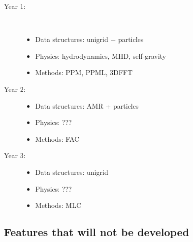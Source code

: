 \documentclass[11pt]{article}
\begin{document}

\begin{description}
\item[Year 1: ]\
\begin{itemize}
\item Data structures: unigrid + particles
\item Physics: hydrodynamics, MHD, self-gravity
\item Methods: PPM, PPML, 3DFFT
\end{itemize}

\item[Year 2: ] 
\begin{itemize}
\item Data structures: AMR + particles
\item Physics: ???
\item Methods: FAC
\end{itemize}

\item[Year 3: ]
\begin{itemize}
\item Data structures: unigrid
\item Physics: ???
\item Methods: MLC
\end{itemize}
\end{description}
\subsection{Features that will not be developed}


\end{document}
